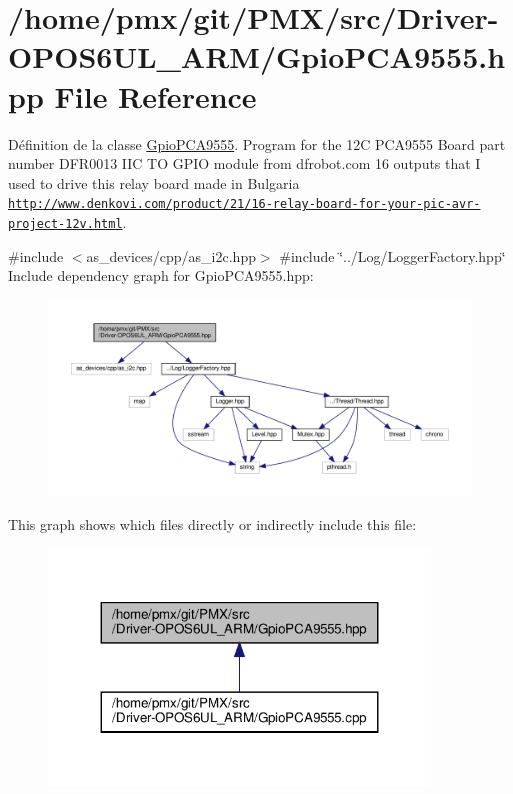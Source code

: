 \hypertarget{Driver-OPOS6UL__ARM_2GpioPCA9555_8hpp}{}\section{/home/pmx/git/\+P\+M\+X/src/\+Driver-\/\+O\+P\+O\+S6\+U\+L\+\_\+\+A\+R\+M/\+Gpio\+P\+C\+A9555.hpp File Reference}
\label{Driver-OPOS6UL__ARM_2GpioPCA9555_8hpp}


Définition de la classe \hyperlink{classGpioPCA9555}{Gpio\+P\+C\+A9555}. Program for the 12C P\+C\+A9555 Board part number D\+F\+R0013 I\+IC TO G\+P\+IO module from dfrobot.\+com 16 outputs that I used to drive this relay board made in Bulgaria \href{http://www.denkovi.com/product/21/16-relay-board-for-your-pic-avr-project-12v.html}{\tt http\+://www.\+denkovi.\+com/product/21/16-\/relay-\/board-\/for-\/your-\/pic-\/avr-\/project-\/12v.\+html}.  


{\ttfamily \#include $<$as\+\_\+devices/cpp/as\+\_\+i2c.\+hpp$>$}\newline
{\ttfamily \#include \char`\"{}../\+Log/\+Logger\+Factory.\+hpp\char`\"{}}\newline
Include dependency graph for Gpio\+P\+C\+A9555.\+hpp\+:
\nopagebreak
\begin{figure}[H]
\begin{center}
\leavevmode
\includegraphics[width=350pt]{Driver-OPOS6UL__ARM_2GpioPCA9555_8hpp__incl}
\end{center}
\end{figure}
This graph shows which files directly or indirectly include this file\+:
\nopagebreak
\begin{figure}[H]
\begin{center}
\leavevmode
\includegraphics[width=287pt]{Driver-OPOS6UL__ARM_2GpioPCA9555_8hpp__dep__incl}
\end{center}
\end{figure}
